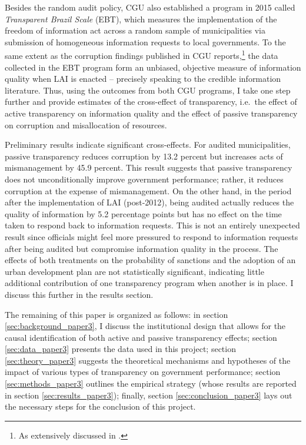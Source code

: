 \documentclass[11pt]{article}
\begin{document}
Besides the random audit policy, CGU also established a program in 2015 called \emph{Transparent Brazil Scale} (EBT), which measures the implementation of the freedom of information act across a random sample of municipalities via submission of homogeneous information requests to local governments. To the same extent as the corruption findings published in CGU reports,\footnote{As extensively discussed in \citet{FerrazExposingCorruptPoliticians2008b,FerrazElectoralAccountabilityCorruption2011a,BrolloPoliticalResourceCurse2013,ZamboniAuditRiskRent2018,AvisGovernmentAuditsReduce2018}.} the data collected in the EBT program form an unbiased, objective measure of information quality when LAI is enacted -- precisely speaking to the credible information literature. Thus, using the outcomes from both CGU programs, I take one step further and provide estimates of the cross-effect of transparency, i.e.~the effect of active transparency on information quality and the effect of passive transparency on corruption and misallocation of resources.

Preliminary results indicate significant cross-effects. For audited municipalities, passive transparency reduces corruption by 13.2 percent but increases acts of mismanagement by 45.9 percent. This result suggests that passive transparency does not unconditionally improve government performance; rather, it reduces corruption at the expense of mismanagement. On the other hand, in the period after the implementation of LAI (post-2012), being audited actually reduces the quality of information by 5.2 percentage points but has no effect on the time taken to respond back to information requests. This is not an entirely unexpected result since officials might feel more pressured to respond to information requests after being audited but compromise information quality in the process. The effects of both treatments on the probability of sanctions and the adoption of an urban development plan are not statistically significant, indicating little additional contribution of one transparency program when another is in place. I discuss this further in the results section.

The remaining of this paper is organized as follows: in section \ref{sec:background_paper3}, I discuss the institutional design that allows for the causal identification of both active and passive transparency effects; section \ref{sec:data_paper3} presents the data used in this project; section \ref{sec:theory_paper3} suggests the theoretical mechanisms and hypotheses of the impact of various types of transparency on government performance; section \ref{sec:methods_paper3} outlines the empirical strategy (whose results are reported in section \ref{sec:results_paper3}); finally, section \ref{sec:conclusion_paper3} lays out the necessary steps for the conclusion of this project.
\end{document}
